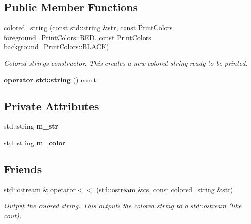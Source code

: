 \subsection*{Public Member Functions}
\begin{DoxyCompactItemize}
\item 
\mbox{\hyperlink{classcolored__string_a73b0c596b43789a0952dfcc9b56c301b}{colored\+\_\+string}} (const std\+::string \&str, const \mbox{\hyperlink{classcolored__string_a76416a7db18c947e5a6d5bf17c78e497}{Print\+Colors}} foreground=\mbox{\hyperlink{classcolored__string_a76416a7db18c947e5a6d5bf17c78e497aa2d9547b5d3dd9f05984475f7c926da0}{Print\+Colors\+::\+R\+ED}}, const \mbox{\hyperlink{classcolored__string_a76416a7db18c947e5a6d5bf17c78e497}{Print\+Colors}} background=\mbox{\hyperlink{classcolored__string_a76416a7db18c947e5a6d5bf17c78e497a08d0012388564e95c3b4a7407cf04965}{Print\+Colors\+::\+B\+L\+A\+CK}})
\begin{DoxyCompactList}\small\item\em Colored string\textquotesingle{}s constructor. This creates a new colored string ready to be printed. \end{DoxyCompactList}\item 
\mbox{\label{classcolored__string_a530408625112fe887b3fd5cf5965f03e}} 
{\bfseries operator std\+::string} () const
\end{DoxyCompactItemize}
\subsection*{Private Attributes}
\begin{DoxyCompactItemize}
\item 
\mbox{\label{classcolored__string_a2506a30243275fae082420c55d087734}} 
std\+::string {\bfseries m\+\_\+str}
\item 
\mbox{\label{classcolored__string_a6028a3a4cec1476dfb4ce48d3f901812}} 
std\+::string {\bfseries m\+\_\+color}
\end{DoxyCompactItemize}
\subsection*{Friends}
\begin{DoxyCompactItemize}
\item 
std\+::ostream \& \mbox{\hyperlink{classcolored__string_a7a425cff7a8554e3612f1ccadb100117}{operator$<$$<$}} (std\+::ostream \&os, const \mbox{\hyperlink{classcolored__string}{colored\+\_\+string}} \&str)
\begin{DoxyCompactList}\small\item\em Output the colored string. This outputs the colored string to a std\+::ostream (like {\ttfamily cout}). \end{DoxyCompactList}\end{DoxyCompactItemize}


